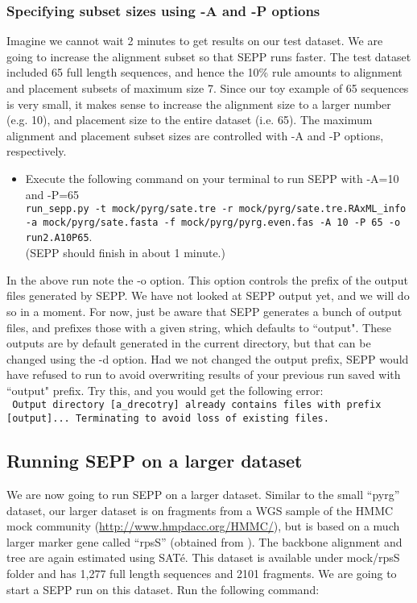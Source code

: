 \documentclass[11pt]{article} %
\newcommand{\sepp}{SEPP\xspace}
\newcommand{\ins}[1]{{\tt #1}}
\newcommand{\file}[1]{{\sf #1}}
\newcommand{\sate}{SAT\'{e}\xspace}
\begin{document}
\subsubsection{Specifying subset sizes using -A and -P options}
Imagine we cannot wait 2 minutes to get results on our test dataset. We are going to increase the alignment subset so that \sepp runs faster. The test dataset included 65 full length sequences, and hence the 10\% rule amounts to alignment and placement subsets of maximum size 7. Since our toy example of 65 sequences is very small, it makes sense to increase the alignment size to a larger number (e.g. 10), and placement size to the entire dataset (i.e. 65). The maximum alignment and placement subset sizes are controlled with -A and -P options, respectively. 

\begin{itemize}
\item Execute the following command on your terminal to run \sepp with -A=10 and -P=65\\

\ins{run\_sepp.py -t mock/pyrg/sate.tre -r mock/pyrg/sate.tre.RAxML\_info -a mock/pyrg/sate.fasta -f mock/pyrg/pyrg.even.fas -A 10 -P 65 -o run2.A10P65}. \\

(\sepp should finish in about 1 minute.)
\end{itemize}

In the above run note the -o option. This option controls the prefix of the output files generated by \sepp. We have not looked at \sepp output yet, and we will do so in a moment. For now, just be aware that \sepp generates a bunch of output files, and prefixes those with a given string, which defaults to ``output". These outputs are by default generated in the current directory, but that can be changed using the -d option. Had we not changed the output prefix, \sepp would have refused to run to avoid overwriting results of your previous run saved with ``output" prefix. Try this, and you would get the following error:\\

\ins{ Output directory [a\_drecotry] already contains files with prefix [output]...
Terminating to avoid loss of existing files.
}


\subsection{Running \sepp on a larger dataset}
We are now going to run \sepp on a larger dataset. 
Similar to the small ``pyrg'' dataset, our larger dataset is on fragments from a WGS sample of the HMMC mock community (\url{http://www.hmpdacc.org/HMMC/}), 
but is based on a much larger marker gene called ``rpsS'' (obtained from \cite{metaphyler}).
The backbone alignment and tree are again estimated using \sate. 
This dataset is available under \file{mock/rpsS} folder and has 1,277 full length sequences and 2101 fragments. 
We are going to start a \sepp run on this dataset. Run the following command:\\
\end{document}
